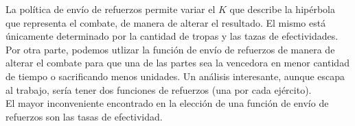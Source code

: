 \documentclass{sig-alternate}
\begin{document}
La política de envío de refuerzos permite variar el $K$ que describe la
hip\'erbola que representa el combate, de manera de alterar el
resultado. El mismo está \'unicamente determinado
por la cantidad de tropas y las tazas de efectividades. 
Por otra parte, podemos utlizar la funci\'on de envío de refuerzos de
manera de alterar el combate para que una de las partes sea la vencedora en menor
cantidad de tiempo o sacrificando menos unidades. Un análisis interesante, aunque escapa al trabajo, sería tener dos funciones de refuerzos (una por cada ejército). \\

El mayor inconveniente encontrado en la elección de una función de envío de refuerzos son las tasas de efectividad.  \\
\end{document}
